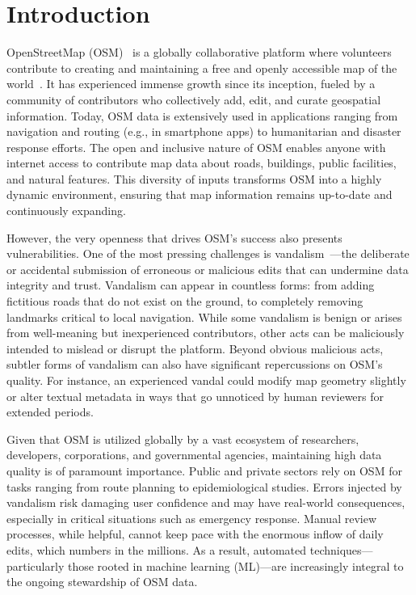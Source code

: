 \documentclass[
    13pt, %
    a4paper, %
    listof=totoc, %
    bibliography=totoc, %
    index=totoc, %
    headsepline
]{scrreprt}
\begin{document}

\pagestyle{fancy}
\chapter{Introduction}\label{intro}

OpenStreetMap (OSM)~\cite{osm_home} is a globally collaborative platform where volunteers contribute to creating and maintaining a free and openly accessible map of the world~\cite{osm_in_geo_inf_sci_2015, world_scale_geo_know_graph_2021}. It has experienced immense growth since its inception, fueled by a community of contributors who collectively add, edit, and curate geospatial information. Today, OSM data is extensively used in applications ranging from navigation and routing (e.g., in smartphone apps) to humanitarian and disaster response efforts. The open and inclusive nature of OSM enables anyone with internet access to contribute map data about roads, buildings, public facilities, and natural features. This diversity of inputs transforms OSM into a highly dynamic environment, ensuring that map information remains up-to-date and continuously expanding.

However, the very openness that drives OSM’s success also presents vulnerabilities. One of the most pressing challenges is vandalism~\cite{vandalism_osm}—the deliberate or accidental submission of erroneous or malicious edits that can undermine data integrity and trust. Vandalism can appear in countless forms: from adding fictitious roads that do not exist on the ground, to completely removing landmarks critical to local navigation. While some vandalism is benign or arises from well-meaning but inexperienced contributors, other acts can be maliciously intended to mislead or disrupt the platform. Beyond obvious malicious acts, subtler forms of vandalism can also have significant repercussions on OSM’s quality. For instance, an experienced vandal could modify map geometry slightly or alter textual metadata in ways that go unnoticed by human reviewers for extended periods.

Given that OSM is utilized globally by a vast ecosystem of researchers, developers, corporations, and governmental agencies, maintaining high data quality is of paramount importance. Public and private sectors rely on OSM for tasks ranging from route planning to epidemiological studies. Errors injected by vandalism risk damaging user confidence and may have real-world consequences, especially in critical situations such as emergency response. Manual review processes, while helpful, cannot keep pace with the enormous inflow of daily edits, which numbers in the millions. As a result, automated techniques—particularly those rooted in machine learning (ML)—are increasingly integral to the ongoing stewardship of OSM data.
\end{document}
